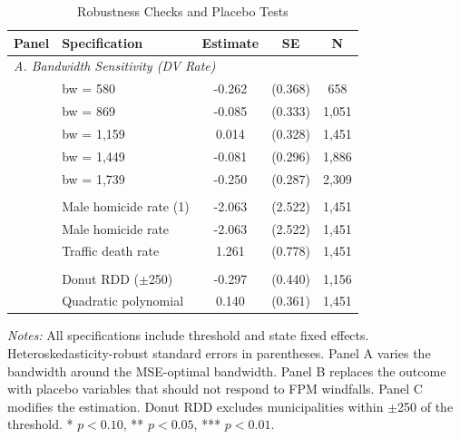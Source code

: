 \begin{table}[H]
\centering
\caption{Robustness Checks and Placebo Tests}
\begin{threeparttable}
\begin{tabular}{llccc}
\toprule
Panel & Specification & Estimate & SE & N \\
\midrule
\multicolumn{5}{l}{\textit{A. Bandwidth Sensitivity (DV Rate)}} \\
  & bw = 580 & -0.262 & (0.368) & 658 \\
  & bw = 869 & -0.085 & (0.333) & 1,051 \\
  & bw = 1,159 & 0.014 & (0.328) & 1,451 \\
  & bw = 1,449 & -0.081 & (0.296) & 1,886 \\
  & bw = 1,739 & -0.250 & (0.287) & 2,309 \\
\addlinespace
\multicolumn{5}{l}{\textit{B. Placebo Outcomes}} \\
  & Male homicide rate (1) & -2.063 & (2.522) & 1,451 \\
  & Male homicide rate & -2.063 & (2.522) & 1,451 \\
  & Traffic death rate & 1.261 & (0.778) & 1,451 \\
\addlinespace
\multicolumn{5}{l}{\textit{C. Specification Robustness (DV Rate)}} \\
  & Donut RDD ($\pm$250) & -0.297 & (0.440) & 1,156 \\
  & Quadratic polynomial & 0.140 & (0.361) & 1,451 \\
\bottomrule
\end{tabular}
\begin{tablenotes}[flushleft]
\small
\item \textit{Notes:} All specifications include threshold and state fixed effects. Heteroskedasticity-robust standard errors in parentheses. Panel A varies the bandwidth around the MSE-optimal bandwidth. Panel B replaces the outcome with placebo variables that should not respond to FPM windfalls. Panel C modifies the estimation. Donut RDD excludes municipalities within $\pm$250 of the threshold. * $p<0.10$, ** $p<0.05$, *** $p<0.01$.
\end{tablenotes}
\end{threeparttable}
\label{tab:robustness}
\end{table}

